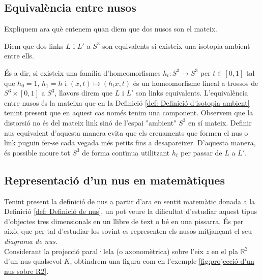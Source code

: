 \subsection{Equivalència entre nusos}\label{Equivalència entre nusos}

Expliquem ara què entenem quan diem que dos nusos son el mateix.

\begin{definition}\label{def: Definició d'isotopia ambient}
	Diem que dos links $L$ i $L'$ a $S^3$ son equivalents si existeix una isotopia ambient entre ells.
\end{definition}
És a dir, si existeix una família d'homeomorfismes $h_t:S^3\rightarrow S^3$ per $t\in[0, 1]$ tal que $h_0=1$, $h_1=h$ i $(x, t)\mapsto(h_{t}x, t)$ és un homeomorfisme lineal a trossos de $S^3\times[0, 1]$ a $S^3$, llavors direm que $L$ i $L'$ son links equivalents. L'equivalència entre nusos és la mateixa que en la Definició \ref{def: Definició d'isotopia ambient} tenint present que en aquest cas només tenim una component. Observem que la distorsió no és del mateix link sinó de l'espai "ambient" $S^3$ en sí mateix. Definir nus equivalent d'aquesta manera evita que els creuaments que formen el nus o link puguin fer-se cada vegada més petits fins a desapareixer. D'aquesta manera, és possible moure tot $S^3$ de forma contïnua utilitzant $h_t$ per passar de $L$ a $L'$.

\subsection{Representació d'un nus en matemàtiques}\label{sec:Representació de nus}
Tenint present la definició de nus a partir d'ara en sentit matemàtic donada a la Definició \ref{def: Definició de nus}, un pot veure la dificultat d'estudiar aquest tipus d'objectes tres dimensionals en un llibre de text o bé en una pissarra. És per això, que per tal d'estudiar-los sovint es representen els nusos mitjançant el seu \textit{diagrama de nus}.\\

Considerant la projecció paral·lela (o axonomètrica) sobre l'eix $z$ en el pla $\mathbb{R}^2$ d'un nus qualsevol $K$, obtindrem una figura com en l'exemple \ref{fig:projecció d'un nus sobre R2}.\\

